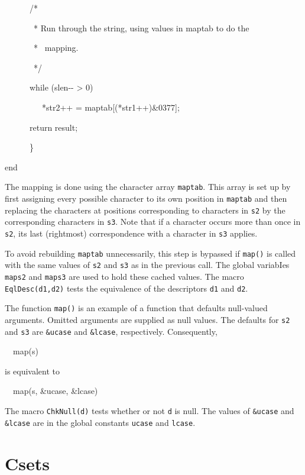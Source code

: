 \bigskip


\ \ \ \ \ \ /*


\ \ \ \ \ \ \ * Run through the string, using values in maptab to do the


\ \ \ \ \ \ \ * \ mapping.


\ \ \ \ \ \ \ */


\ \ \ \ \ \ while (slen-{}- {\textgreater} 0)


\ \ \ \ \ \ \ \ \ *str2++ = maptab[(*str1++)\&0377];


\bigskip


\ \ \ \ \ \ return result;


\ \ \ \ \ \ \}


end


\bigskip


The mapping is done using the character array \texttt{maptab}. This
array is set up by first assigning every possible character to its own
position in \texttt{maptab} and then replacing the characters at
positions corresponding to characters in \texttt{s2} by the
corresponding characters in \texttt{s3}. Note that if a character
occurs more than once in \texttt{s2}, its last (rightmost)
correspondence with a character in \texttt{s3} applies.

To avoid rebuilding \texttt{maptab} unnecessarily, this step is
bypassed if \texttt{map()} is called with the same values of
\texttt{s2} and \texttt{s3} as in the previous call. The global
variabIes \texttt{maps2} and \texttt{maps3} are used to hold these
{\textquotedbl}cached{\textquotedbl} values. The macro
\texttt{EqlDesc(d1,d2)} tests the equivalence of the descriptors
\texttt{d1} and \texttt{d2}.

The function \texttt{map()} is an example of a function that defaults
null-valued arguments. Omitted arguments are supplied as null
values. The defaults for \texttt{s2} and \texttt{s3} are
\texttt{\&ucase} and \texttt{\&lcase}, respectively. Consequently,

{\ttfamily\mdseries
\ \ map(s)}

\noindent
is equivalent to

{\ttfamily\mdseries
\ \ map(s, \&ucase, \&lcase)}


The macro \texttt{ChkNull(d)} tests whether or not \texttt{d} is
null. The values of \texttt{\&ucase} and \texttt{\&lcase} are in the
global constants \texttt{ucase} and \texttt{lcase}.

\section{Csets}

